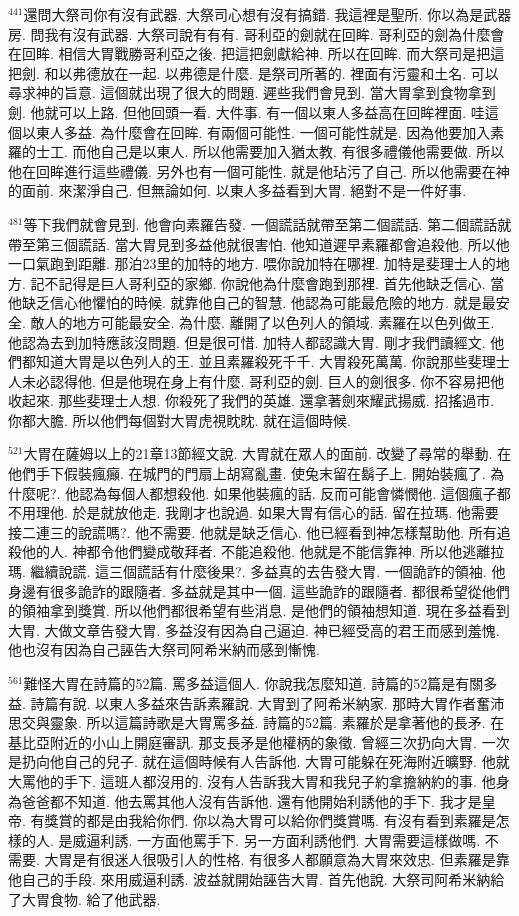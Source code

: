 \documentclass{book}
\begin{document}
$^{441}$還問大祭司你有沒有武器.
大祭司心想有沒有搞錯.
我這裡是聖所.
你以為是武器房.
問我有沒有武器.
大祭司說有有有.
哥利亞的劍就在回眸.
哥利亞的劍為什麼會在回眸.
相信大胃戰勝哥利亞之後.
把這把劍獻給神.
所以在回眸.
而大祭司是把這把劍.
和以弗德放在一起.
以弗德是什麼.
是祭司所著的.
裡面有污靈和土名.
可以尋求神的旨意.
這個就出現了很大的問題.
遲些我們會見到.
當大胃拿到食物拿到劍.
他就可以上路.
但他回頭一看.
大件事.
有一個以東人多益高在回眸裡面.
哇這個以東人多益.
為什麼會在回眸.
有兩個可能性.
一個可能性就是.
因為他要加入素羅的士工.
而他自己是以東人.
所以他需要加入猶太教.
有很多禮儀他需要做.
所以他在回眸進行這些禮儀.
另外也有一個可能性.
就是他玷污了自己.
所以他需要在神的面前.
來潔淨自己.
但無論如何.
以東人多益看到大胃.
絕對不是一件好事.

$^{481}$等下我們就會見到.
他會向素羅告發.
一個謊話就帶至第二個謊話.
第二個謊話就帶至第三個謊話.
當大胃見到多益他就很害怕.
他知道遲早素羅都會追殺他.
所以他一口氣跑到距離.
那泊23里的加特的地方.
喂你說加特在哪裡.
加特是斐理士人的地方.
記不記得是巨人哥利亞的家鄉.
你說他為什麼會跑到那裡.
首先他缺乏信心.
當他缺乏信心他懼怕的時候.
就靠他自己的智慧.
他認為可能最危險的地方.
就是最安全.
敵人的地方可能最安全.
為什麼.
離開了以色列人的領域.
素羅在以色列做王.
他認為去到加特應該沒問題.
但是很可惜.
加特人都認識大胃.
剛才我們讀經文.
他們都知道大胃是以色列人的王.
並且素羅殺死千千.
大胃殺死萬萬.
你說那些斐理士人未必認得他.
但是他現在身上有什麼.
哥利亞的劍.
巨人的劍很多.
你不容易把他收起來.
那些斐理士人想.
你殺死了我們的英雄.
還拿著劍來耀武揚威.
招搖過市.
你都大膽.
所以他們每個對大胃虎視眈眈.
就在這個時候.

$^{521}$大胃在薩姆以上的21章13節經文說.
大胃就在眾人的面前.
改變了尋常的舉動.
在他們手下假裝瘋癲.
在城門的門扇上胡寫亂畫.
使兔末留在鬍子上.
開始裝瘋了.
為什麼呢?.
他認為每個人都想殺他.
如果他裝瘋的話.
反而可能會憐憫他.
這個瘋子都不用理他.
於是就放他走.
我剛才也說過.
如果大胃有信心的話.
留在拉瑪.
他需要接二連三的說謊嗎?.
他不需要.
他就是缺乏信心.
他已經看到神怎樣幫助他.
所有追殺他的人.
神都令他們變成敬拜者.
不能追殺他.
他就是不能信靠神.
所以他逃離拉瑪.
繼續說謊.
這三個謊話有什麼後果?.
多益真的去告發大胃.
一個詭詐的領袖.
他身邊有很多詭詐的跟隨者.
多益就是其中一個.
這些詭詐的跟隨者.
都很希望從他們的領袖拿到獎賞.
所以他們都很希望有些消息.
是他們的領袖想知道.
現在多益看到大胃.
大做文章告發大胃.
多益沒有因為自己逼迫.
神已經受高的君王而感到羞愧.
他也沒有因為自己誣告大祭司阿希米納而感到慚愧.

$^{561}$難怪大胃在詩篇的52篇.
罵多益這個人.
你說我怎麼知道.
詩篇的52篇是有關多益.
詩篇有說.
以東人多益來告訴素羅說.
大胃到了阿希米納家.
那時大胃作者奮沛思交與靈象.
所以這篇詩歌是大胃罵多益.
詩篇的52篇.
素羅於是拿著他的長矛.
在基比亞附近的小山上開庭審訊.
那支長矛是他權柄的象徵.
曾經三次扔向大胃.
一次是扔向他自己的兒子.
就在這個時候有人告訴他.
大胃可能躲在死海附近曠野.
他就大罵他的手下.
這班人都沒用的.
沒有人告訴我大胃和我兒子約拿擔納約的事.
他身為爸爸都不知道.
他去罵其他人沒有告訴他.
還有他開始利誘他的手下.
我才是皇帝.
有獎賞的都是由我給你們.
你以為大胃可以給你們獎賞嗎.
有沒有看到素羅是怎樣的人.
是威逼利誘.
一方面他罵手下.
另一方面利誘他們.
大胃需要這樣做嗎.
不需要.
大胃是有很迷人很吸引人的性格.
有很多人都願意為大胃來效忠.
但素羅是靠他自己的手段.
來用威逼利誘.
波益就開始誣告大胃.
首先他說.
大祭司阿希米納給了大胃食物.
給了他武器.
\end{document}
